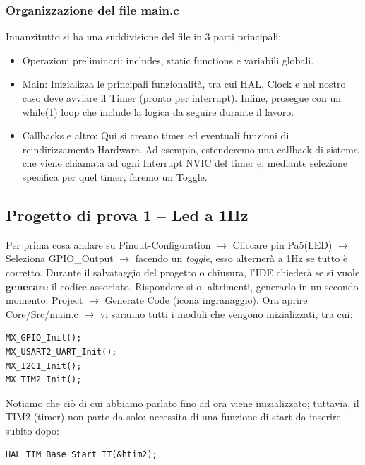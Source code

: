 \subsubsection{Organizzazione del file main.c }

Innanzitutto si ha una suddivisione del file in 3 parti principali:
\begin{itemize}
    \item Operazioni preliminari: includes, static functions e variabili globali.
    \item Main: Inizializza le principali funzionalità, tra cui HAL, Clock e nel nostro caso deve avviare il Timer (pronto per interrupt). Infine, prosegue con un while(1) loop che include la logica da seguire durante il lavoro.
    \item Callbacks e altro: Qui si creano timer ed eventuali funzioni di reindirizzamento Hardware. Ad esempio, estenderemo una callback di sistema che viene chiamata ad ogni Interrupt NVIC del timer e, mediante selezione specifica per quel timer, faremo un Toggle.
\end{itemize}

\subsection{Progetto di prova 1 -- Led a 1Hz}

Per prima cosa andare su Pinout-Configuration $\rightarrow$ Cliccare pin Pa5(LED) $\rightarrow$ Seleziona GPIO\_Output $\rightarrow$ facendo un \textit{toggle}, esso alternerà a 1Hz se tutto è corretto. 
Durante il salvataggio del progetto o chiusura, l’IDE chiederà se si vuole \textbf{generare} il codice associato. Rispondere sì o, altrimenti, generarlo in un secondo momento: Project $\rightarrow$ Generate Code (icona ingranaggio). Ora aprire Core/Src/main.c $\rightarrow$ vi saranno tutti i moduli che vengono inizializzati, tra cui:


\begin{verbatim}
MX_GPIO_Init();
MX_USART2_UART_Init();
MX_I2C1_Init();
MX_TIM2_Init();
\end{verbatim}

Notiamo che ciò di cui abbiamo parlato fino ad ora viene inizializzato; tuttavia, il TIM2 (timer) non parte da solo: necessita di una funzione di start da inserire subito dopo:

\begin{verbatim}
HAL_TIM_Base_Start_IT(&htim2);
\end{verbatim}

